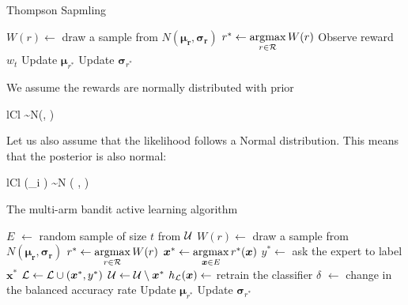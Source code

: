 \begin{algorithm}[tbp]
	\caption{Thompson Sapmling}
	\label{alg:thompson}
	\begin{algorithmic}[1]
				\State $W(r) \leftarrow$ draw a sample from $N(\bm{\mu_r}, \bm{\sigma_r})$
			\Endforeach
			\State $r^* \leftarrow \argmax_{r \in \R} W(r)$
			\State Observe reward $w_t$
			\State Update $\bm{\mu}_{r^*}$
			\State Update $\bm{\sigma}_{r^*}$
		\Endforeach
		\EndProcedure
	\end{algorithmic}
\end{algorithm}

We assume the rewards are normally distributed with prior
	\begin{IEEEeqnarray*}{lCl}
		 \sim N(\bm{\mu}, \sigma {})
	\end{IEEEeqnarray*}
Let us also assume that the likelihood follows a Normal distribution. This means
that the posterior is also normal:
	\begin{IEEEeqnarray*}{lCl}
		(_i \mid \bm{\tau}) \sim N \left(
			,
			\right)
	\end{IEEEeqnarray*}

\begin{algorithm}[tbp]
	\caption{The multi-arm bandit active learning algorithm}
	\label{alg:bandit}
	\begin{algorithmic}[1]
		\State $E$ $\leftarrow$ random sample of size $t$ from $\mathcal{U}$
			\State $W(r) \leftarrow$ draw a sample from $N(\bm{\mu_r}, \bm{\sigma_r})$
		\Endforeach
		\State $r^* \leftarrow \argmax_{r \in \R} W(r)$
		\State $\bm{x}^* \leftarrow \argmax_{\bm{x} \in E} r^*(\bm{x})$
		\State $y^* \leftarrow$ ask the expert to label $\bm{x}^*$
		\State $\mathcal{L} \leftarrow \mathcal{L}  \cup (\bm{x}^*, y^*)$
		\State $\mathcal{U} \leftarrow \mathcal{U} \setminus \bm{x}^*$
		\State $h_{\mathcal{L}}(\bm{x}) \leftarrow$ retrain the classifier
		\State $\delta$ $\leftarrow$ change in the balanced accuracy rate 
		\State Update $\bm{\mu}_{r^*}$
		\State Update $\bm{\sigma}_{r^*}$
		\EndWhile
		\EndProcedure
	\end{algorithmic}
\end{algorithm}


